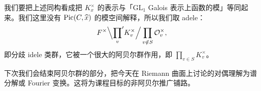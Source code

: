 我们要把上述同构看成把 $K_x^\times$ 的表示与「$\mathrm{GL}_1$ Galois 表示上函数的模」等同起来。我们这里没有 $\operatorname{Pic}(C,\widehat{x})$ 的模空间解释，所以我们取 adele：
\[
  F^\times\Big\backslash {\prod_v}' K_v^\times \Big/ \prod_{v\notin S}\mathcal{O}_v^\times,
\]
即分歧 idele 类群，它被一个很大的阿贝尔群作用，即 $\prod_{v\in S}K_v^\times$。

下次我们会结束阿贝尔群的部分，把今天在 Riemann 曲面上讨论的对偶理解为谱分解或 Fourier 变换。这将为课程目标的非阿贝尔推广铺路。

